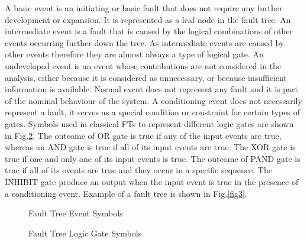 \documentclass[10pt]{llncs}
\begin{document}
A basic event is an initiating or basic fault that does not require any further development or expansion. It is represented as a leaf node in the fault tree. An intermediate event is a fault that is caused by the logical combinations of other events occurring further down the tree. As intermediate events are caused by other events therefore they are almost always a type of logical gate. An undeveloped event is an event whose contributions are not considered in the analysis, either because it is considered as unnecessary, or because insufficient information is available. Normal event does not represent any fault and it is part of the nominal behaviour of the system.  A conditioning event does not necessarily represent a fault, it serves as a special condition or constraint for certain types of gates. Symbols used in classical FTs to represent different logic gates are shown in Fig.\ref{fig2}.  The outcome of OR gate is true if any of the input events are true, whereas an AND gate is true if all of its input events are true. The XOR gate is true if one and only one of its input events is true. The outcome of PAND gate is true if all of its events   are true and they occur in a specific sequence. The INHIBIT gate produce an output when the input event is true in the presence of a conditioning event. Example of a fault tree is shown in Fig.\ref{fig3}.


\begin{figure}[thpb]
      \centering
      \caption{Fault Tree Event Symbols}
      \label{fig1}
   \end{figure}


\begin{figure}[thpb]
      \centering
      \caption{Fault Tree Logic Gate Symbols}
      \label{fig2}
   \end{figure}
\end{document}
